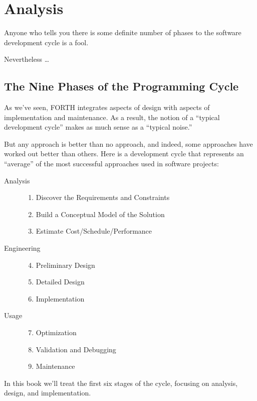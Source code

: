 

\chapter{Analysis}


Anyone who tells you there is some definite number of phases to the
software development cycle is a fool.

Nevertheless \dots{}

\section{The Nine Phases of the Programming Cycle}

As we've seen, FORTH integrates aspects of design with aspects of
implementation and maintenance. As a result, the notion of a ``typical
development cycle'' makes as much sense as a ``typical noise.''

But any approach is better than no approach, and indeed, some
approaches have worked out better than others. Here is a development
cycle that represents an ``average'' of the most successful approaches
used in software projects:

\begin{description}
\item[Analysis] \hfill
    \begin{enumerate}
    \item Discover the Requirements and Constraints
    \item Build a Conceptual Model of the Solution
    \item Estimate Cost/Schedule/Performance
    \end{enumerate}
\item[Engineering] \hfill
    \begin{enumerate}
    \setcounter{enumi}{3}
    \item Preliminary Design
    \item Detailed Design
    \item Implementation
    \end{enumerate}
\item[Usage] \hfill
    \begin{enumerate}
    \setcounter{enumi}{6}
    \item Optimization
    \item Validation and Debugging
    \item Maintenance
    \end{enumerate}
\end{description}
In this book we'll treat the first six stages of the cycle,
focusing on analysis, design, and implementation.

